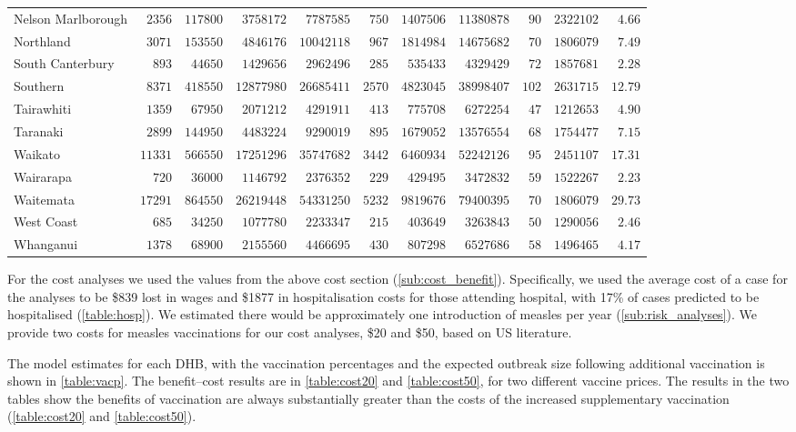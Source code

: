 \documentclass{article}
\begin{document}
\begin{table}
\begin{center}
\begin{tabular}{lrrrrrrrrrr}
Nelson Marlborough&$ 2356$&$117800$&$ 3758172$&$ 7787585$&$ 750$&$ 1407506$&$11380878$&$ 90$&$2322102$&$ 4.66$\tabularnewline
Northland&$ 3071$&$153550$&$ 4846176$&$10042118$&$ 967$&$ 1814984$&$14675682$&$ 70$&$1806079$&$ 7.49$\tabularnewline
South Canterbury&$  893$&$ 44650$&$ 1429656$&$ 2962496$&$ 285$&$  535433$&$ 4329429$&$ 72$&$1857681$&$ 2.28$\tabularnewline
Southern&$ 8371$&$418550$&$12877980$&$26685411$&$2570$&$ 4823045$&$38998407$&$102$&$2631715$&$12.79$\tabularnewline
Tairawhiti&$ 1359$&$ 67950$&$ 2071212$&$ 4291911$&$ 413$&$  775708$&$ 6272254$&$ 47$&$1212653$&$ 4.90$\tabularnewline
Taranaki&$ 2899$&$144950$&$ 4483224$&$ 9290019$&$ 895$&$ 1679052$&$13576554$&$ 68$&$1754477$&$ 7.15$\tabularnewline
Waikato&$11331$&$566550$&$17251296$&$35747682$&$3442$&$ 6460934$&$52242126$&$ 95$&$2451107$&$17.31$\tabularnewline
Wairarapa&$  720$&$ 36000$&$ 1146792$&$ 2376352$&$ 229$&$  429495$&$ 3472832$&$ 59$&$1522267$&$ 2.23$\tabularnewline
Waitemata&$17291$&$864550$&$26219448$&$54331250$&$5232$&$ 9819676$&$79400395$&$ 70$&$1806079$&$29.73$\tabularnewline
West Coast&$  685$&$ 34250$&$ 1077780$&$ 2233347$&$ 215$&$  403649$&$ 3263843$&$ 50$&$1290056$&$ 2.46$\tabularnewline
Whanganui&$ 1378$&$ 68900$&$ 2155560$&$ 4466695$&$ 430$&$  807298$&$ 6527686$&$ 58$&$1496465$&$ 4.17$\tabularnewline
\hline
\end{tabular}\end{center}\label{table:cost50}
\end{table}


For the cost analyses we used the values from the above cost section (\autoref{sub:cost_benefit}). Specifically, we used the average cost of a case for the analyses to be \$839 lost in wages and \$1877 in hospitalisation costs for those attending hospital, with 17\% of cases predicted to be hospitalised (\autoref{table:hosp}). We estimated there would be approximately one introduction of measles per year (\autoref{sub:risk_analyses}). We provide two costs for measles vaccinations for our cost analyses, \$20 and \$50, based on US literature.

The model estimates for each DHB, with the vaccination percentages and the expected outbreak size following additional vaccination is shown in \autoref{table:vacp}. The benefit--cost results are in \autoref{table:cost20} and \autoref{table:cost50}, for two different vaccine prices. The results in the two tables show the benefits of vaccination are always substantially greater than the costs of the increased supplementary vaccination (\autoref{table:cost20} and \autoref{table:cost50}).
\end{document}
